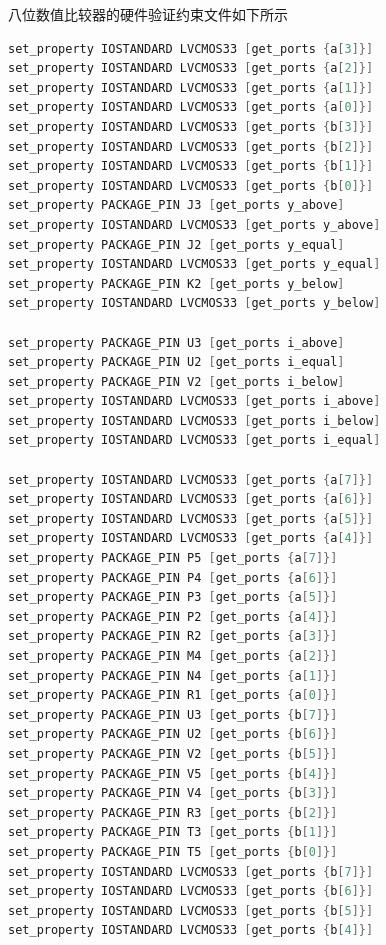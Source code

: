 \documentclass{article}
\begin{document}
八位数值比较器的硬件验证约束文件如下所示\\
\begin{lstlisting}[language=Verilog, caption={八位数值比较器约束文件}]
set_property IOSTANDARD LVCMOS33 [get_ports {a[3]}]
set_property IOSTANDARD LVCMOS33 [get_ports {a[2]}]
set_property IOSTANDARD LVCMOS33 [get_ports {a[1]}]
set_property IOSTANDARD LVCMOS33 [get_ports {a[0]}]
set_property IOSTANDARD LVCMOS33 [get_ports {b[3]}]
set_property IOSTANDARD LVCMOS33 [get_ports {b[2]}]
set_property IOSTANDARD LVCMOS33 [get_ports {b[1]}]
set_property IOSTANDARD LVCMOS33 [get_ports {b[0]}]
set_property PACKAGE_PIN J3 [get_ports y_above]
set_property IOSTANDARD LVCMOS33 [get_ports y_above]
set_property PACKAGE_PIN J2 [get_ports y_equal]
set_property IOSTANDARD LVCMOS33 [get_ports y_equal]
set_property PACKAGE_PIN K2 [get_ports y_below]
set_property IOSTANDARD LVCMOS33 [get_ports y_below]

set_property PACKAGE_PIN U3 [get_ports i_above]
set_property PACKAGE_PIN U2 [get_ports i_equal]
set_property PACKAGE_PIN V2 [get_ports i_below]
set_property IOSTANDARD LVCMOS33 [get_ports i_above]
set_property IOSTANDARD LVCMOS33 [get_ports i_below]
set_property IOSTANDARD LVCMOS33 [get_ports i_equal]

set_property IOSTANDARD LVCMOS33 [get_ports {a[7]}]
set_property IOSTANDARD LVCMOS33 [get_ports {a[6]}]
set_property IOSTANDARD LVCMOS33 [get_ports {a[5]}]
set_property IOSTANDARD LVCMOS33 [get_ports {a[4]}]
set_property PACKAGE_PIN P5 [get_ports {a[7]}]
set_property PACKAGE_PIN P4 [get_ports {a[6]}]
set_property PACKAGE_PIN P3 [get_ports {a[5]}]
set_property PACKAGE_PIN P2 [get_ports {a[4]}]
set_property PACKAGE_PIN R2 [get_ports {a[3]}]
set_property PACKAGE_PIN M4 [get_ports {a[2]}]
set_property PACKAGE_PIN N4 [get_ports {a[1]}]
set_property PACKAGE_PIN R1 [get_ports {a[0]}]
set_property PACKAGE_PIN U3 [get_ports {b[7]}]
set_property PACKAGE_PIN U2 [get_ports {b[6]}]
set_property PACKAGE_PIN V2 [get_ports {b[5]}]
set_property PACKAGE_PIN V5 [get_ports {b[4]}]
set_property PACKAGE_PIN V4 [get_ports {b[3]}]
set_property PACKAGE_PIN R3 [get_ports {b[2]}]
set_property PACKAGE_PIN T3 [get_ports {b[1]}]
set_property PACKAGE_PIN T5 [get_ports {b[0]}]
set_property IOSTANDARD LVCMOS33 [get_ports {b[7]}]
set_property IOSTANDARD LVCMOS33 [get_ports {b[6]}]
set_property IOSTANDARD LVCMOS33 [get_ports {b[5]}]
set_property IOSTANDARD LVCMOS33 [get_ports {b[4]}]
\end{lstlisting}
\end{document}
